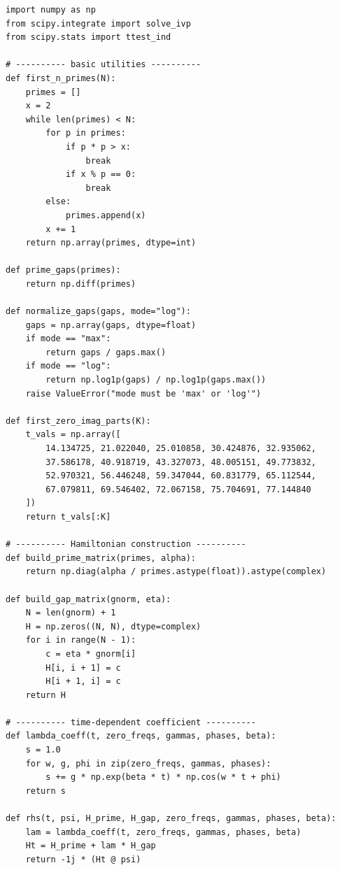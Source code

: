 \documentclass[11pt]{article}
\begin{document}
\begin{verbatim}
import numpy as np
from scipy.integrate import solve_ivp
from scipy.stats import ttest_ind

# ---------- basic utilities ----------
def first_n_primes(N):
    primes = []
    x = 2
    while len(primes) < N:
        for p in primes:
            if p * p > x:
                break
            if x % p == 0:
                break
        else:
            primes.append(x)
        x += 1
    return np.array(primes, dtype=int)

def prime_gaps(primes):
    return np.diff(primes)

def normalize_gaps(gaps, mode="log"):
    gaps = np.array(gaps, dtype=float)
    if mode == "max":
        return gaps / gaps.max()
    if mode == "log":
        return np.log1p(gaps) / np.log1p(gaps.max())
    raise ValueError("mode must be 'max' or 'log'")

def first_zero_imag_parts(K):
    t_vals = np.array([
        14.134725, 21.022040, 25.010858, 30.424876, 32.935062,
        37.586178, 40.918719, 43.327073, 48.005151, 49.773832,
        52.970321, 56.446248, 59.347044, 60.831779, 65.112544,
        67.079811, 69.546402, 72.067158, 75.704691, 77.144840
    ])
    return t_vals[:K]

# ---------- Hamiltonian construction ----------
def build_prime_matrix(primes, alpha):
    return np.diag(alpha / primes.astype(float)).astype(complex)

def build_gap_matrix(gnorm, eta):
    N = len(gnorm) + 1
    H = np.zeros((N, N), dtype=complex)
    for i in range(N - 1):
        c = eta * gnorm[i]
        H[i, i + 1] = c
        H[i + 1, i] = c
    return H

# ---------- time-dependent coefficient ----------
def lambda_coeff(t, zero_freqs, gammas, phases, beta):
    s = 1.0
    for w, g, phi in zip(zero_freqs, gammas, phases):
        s += g * np.exp(beta * t) * np.cos(w * t + phi)
    return s

def rhs(t, psi, H_prime, H_gap, zero_freqs, gammas, phases, beta):
    lam = lambda_coeff(t, zero_freqs, gammas, phases, beta)
    Ht = H_prime + lam * H_gap
    return -1j * (Ht @ psi)


\end{verbatim}
\end{document}
